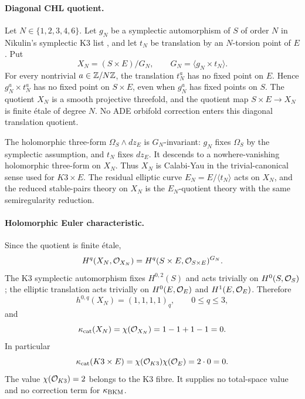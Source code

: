 \paragraph{Diagonal CHL quotient.}
Let $N\in\{1,2,3,4,6\}$.  Let $g_N$ be a symplectic automorphism of
$S$ of order $N$ in Nikulin's symplectic K3 list
\cite{Nikulin1980}, and let $t_N$ be translation by an $N$-torsion
point of $E$.  Put
\[
  X_N=(S\times E)/G_N,\qquad
  G_N=\langle g_N\times t_N\rangle .
\]
For every nontrivial $a\in\mathbb{Z}/N\mathbb{Z}$, the translation $t_N^a$ has no fixed
point on $E$.  Hence $g_N^a\times t_N^a$ has no fixed point on
$S\times E$, even when $g_N^a$ has fixed points on $S$.  The quotient
$X_N$ is a smooth projective threefold, and the quotient map
$S\times E\to X_N$ is finite \'etale of degree $N$.  No ADE orbifold
correction enters this diagonal translation quotient.

The holomorphic three-form $\Omega_S\wedge dz_E$ is $G_N$-invariant:
$g_N$ fixes $\Omega_S$ by the symplectic assumption, and $t_N$ fixes
$dz_E$.  It descends to a nowhere-vanishing holomorphic three-form on
$X_N$.  Thus $X_N$ is Calabi-Yau in the trivial-canonical sense used
for $K3\times E$.  The residual elliptic curve
$E_N=E/\langle t_N\rangle$ acts on $X_N$, and the reduced stable-pairs
theory on $X_N$ is the $E_N$-quotient theory with the same
semiregularity reduction.

\paragraph{Holomorphic Euler characteristic.}
Since the quotient is finite \'etale,
\[
  H^q(X_N,\mathcal{O}_{X_N})
  =H^q(S\times E,\mathcal{O}_{S\times E})^{G_N}.
\]
The K3 symplectic automorphism fixes $H^{0,2}(S)$ and acts trivially on
$H^0(S,\mathcal{O}_S)$; the elliptic translation acts trivially on
$H^0(E,\mathcal{O}_E)$ and $H^1(E,\mathcal{O}_E)$.  Therefore
\[
  h^{0,q}(X_N)=(1,1,1,1)_q,\qquad 0\le q\le 3,
\]
and
\[
  \kappa_{\mathrm{cat}}(X_N)=\chi(\mathcal{O}_{X_N})=1-1+1-1=0.
\]
In particular
\[
  \kappa_{\mathrm{cat}}(K3\times E)=\chi(\mathcal{O}_{K3})\chi(\mathcal{O}_E)=2\cdot 0=0.
\]
The value $\chi(\mathcal{O}_{K3})=2$ belongs to the K3 fibre.  It supplies no
total-space value and no correction term for $\kappa_{\mathrm{BKM}}$.

